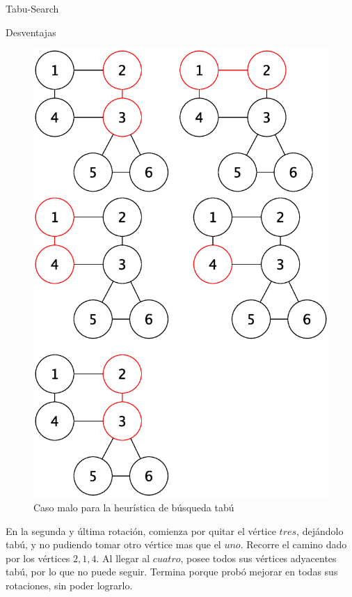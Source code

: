 \begin{section}{Tabu-Search}
\begin{subsection}{Desventajas}
			\begin{figure}[H]
				\centering
		    	\includegraphics[scale=0.5]{tabu_search/segCasoMalo_cont.eps}
			    \caption{Caso malo para la heurística de búsqueda tabú}
			    \label{fig:seguimiento_busqueda_tabu_continuacion}
			\end{figure}

		En la segunda y última rotación, comienza por quitar el vértice $tres$, dejándolo tabú, y no pudiendo tomar otro vértice mas que el $uno$. Recorre el camino dado por los vértices $2,1,4$. Al llegar al $cuatro$, posee todos sus vértices adyacentes tabú, por lo que no puede seguir. Termina porque probó mejorar en todas sus rotaciones, sin poder lograrlo.

	\end{subsection}


\end{section}
